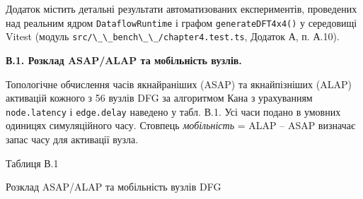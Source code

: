 \documentclass[
]{article}
\newcommand{\passthrough}[1]{#1}
\begin{document}
Додаток містить детальні результати автоматизованих експериментів,
проведених над реальним ядром \passthrough{\lstinline!DataflowRuntime!}
і графом
\passthrough{\lstinline!generateDFT!}\passthrough{\lstinline!4!}\passthrough{\lstinline!x!}\passthrough{\lstinline!4()!}
у середовищі Vitest (модуль
\passthrough{\lstinline!src!}\passthrough{\lstinline!/\_\_!}\passthrough{\lstinline!bench!}\passthrough{\lstinline!\_\_/!}\passthrough{\lstinline!chapter!}\passthrough{\lstinline!4.!}\passthrough{\lstinline!test!}\passthrough{\lstinline!.!}\passthrough{\lstinline!ts!},
Додаток А, п. А.10).

\textbf{В.1. Розклад ASAP/ALAP та мобільність вузлів.}

Топологічне обчислення часів якнайраніших (ASAP) та якнайпізніших (ALAP)
активацій кожного з 56 вузлів DFG за алгоритмом Кана з урахуванням
\passthrough{\lstinline!node!}\passthrough{\lstinline!.!}\passthrough{\lstinline!latency!}
і
\passthrough{\lstinline!edge!}\passthrough{\lstinline!.!}\passthrough{\lstinline!delay!}
наведено у табл. В.1. Усі часи подано в умовних одиницях симуляційного
часу. Стовпець \emph{мобільність} = ALAP -- ASAP визначає запас часу для
активації вузла.

Таблиця В.1

Розклад ASAP/ALAP та мобільність вузлів DFG
\end{document}
